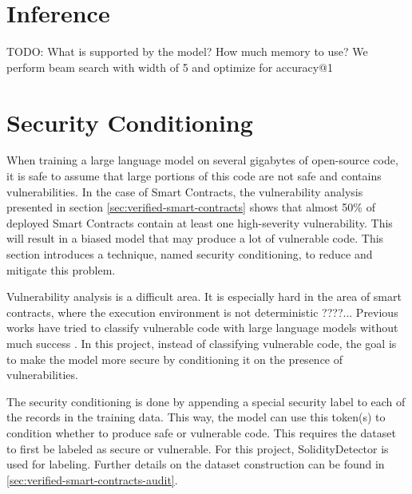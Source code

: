 \section{Inference}

TODO: What is supported by the model? How much memory to use?
We perform beam search with width of 5 and optimize for accuracy@1


\section{Security Conditioning}
When training a large language model on several gigabytes of open-source code, it is safe to assume that large portions of this code are not safe and contains vulnerabilities. In the case of Smart Contracts, the vulnerability analysis presented in section \ref{sec:verified-smart-contracts} shows that almost 50\% of deployed Smart Contracts contain at least one high-severity vulnerability. This will result in a biased model that may produce a lot of vulnerable code. This section introduces a technique, named security conditioning, to reduce and mitigate this problem.

Vulnerability analysis is a difficult area. It is especially hard in the area of smart contracts, where the execution environment is not deterministic ????... Previous works have tried to classify vulnerable code with large language models without much success . In this project, instead of classifying vulnerable code, the goal is to make the model more secure by conditioning it on the presence of vulnerabilities.

The security conditioning is done by appending a special security label to each of the records in the training data. This way, the model can use this token(s) to condition whether to produce safe or vulnerable code. This requires the dataset to first be labeled as secure or vulnerable. For this project, SolidityDetector is used for labeling. Further details on the dataset construction can be found in \cref{sec:verified-smart-contracts-audit}.

